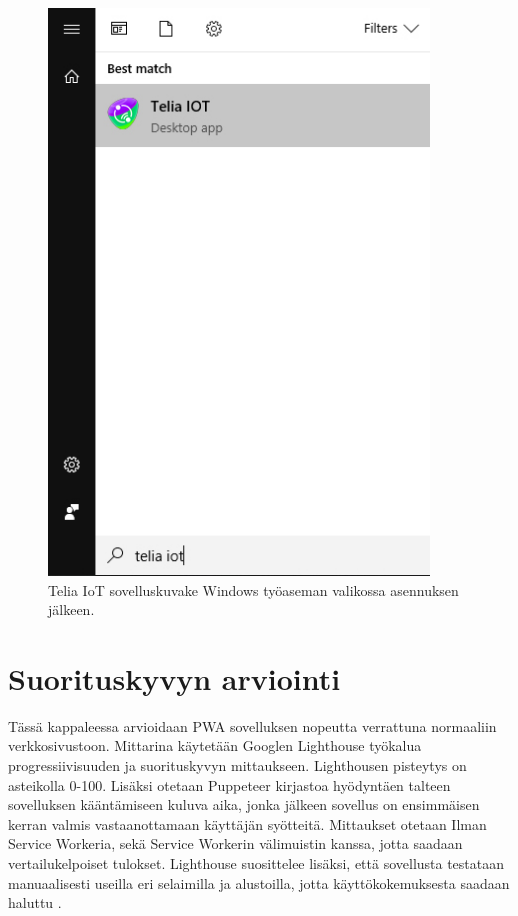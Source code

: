 \documentclass{tktltiki}
\begin{document}
\begin{figure}[!ht]
  \centering
      \includegraphics[width=0.9\textwidth]{windows_valikossa.jpg}
  \caption{Telia IoT sovelluskuvake Windows työaseman valikossa asennuksen jälkeen.}
  \label{teliaiot_windowsvalikossa}
\end{figure}



\clearpage
\section{Suorituskyvyn arviointi}

Tässä kappaleessa arvioidaan PWA sovelluksen nopeutta verrattuna normaaliin verkkosivustoon. Mittarina käytetään Googlen Lighthouse työkalua progressiivisuuden ja suorituskyvyn mittaukseen. Lighthousen pisteytys on asteikolla 0-100. Lisäksi otetaan Puppeteer kirjastoa hyödyntäen talteen sovelluksen kääntämiseen kuluva aika, jonka jälkeen sovellus on ensimmäisen kerran valmis vastaanottamaan käyttäjän syötteitä. Mittaukset otetaan Ilman Service Workeria, sekä Service Workerin välimuistin kanssa, jotta saadaan vertailukelpoiset tulokset. Lighthouse suosittelee lisäksi, että sovellusta testataan manuaalisesti useilla eri selaimilla ja alustoilla, jotta käyttökokemuksesta saadaan haluttu \cite{von2018progressive}.
\end{document}
